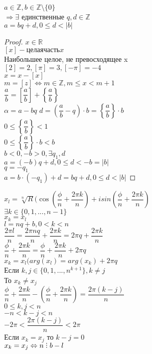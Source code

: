\begin{theorem}
	$ a \in \mathbb{Z}, b \in \mathbb{Z} \setminus \{0\} $ \\
	$ \Rightarrow \exists $ единственные $ q, d \in \mathbb{Z} $ \\
	$ a = bq + d, 0 \leq d < |b| $
	\begin{proof}
		$ x \in \mathbb{R} $\\
		$ [x] - целая часть x $ \\
		Наибольшее целое, не превосходящее x \\
		$ [2] = 2, [\pi] = 3, [-\pi] = -4 $ \\
		$ {x} = x - [x] $ \\
		$ m = [z] \Leftrightarrow m \in \mathbb{Z}, m \leq x < m+1 $ \\
		$ \dfrac{a}{b} = \left[ \dfrac{a}{b} \right] + \left\{ \dfrac{a}{b} \right\} $ \\
		$ \alpha = a - bq $ 
		$ d = \left( \dfrac{a}{b} - q \right) \cdot b = \left\{ \dfrac{a}{b} \right\} \cdot b $\\
		$ 0 \leq \left\{ \dfrac{a}{b} \right\} < 1 $ \\
		$ 0 \leq \left\{ \dfrac{a}{b} \right\} \cdot b < b $ \\
		$ b < 0, -b > 0,  \exists q_1, d $ \\
		$ a = (-b)q + d, 0 \leq d < -b = |b| $ \\
		$ q = -q_1 $ \\
		$ a = b \cdot (-q_1) + d = bq+d, 0 \leq d < |b| $ 
	\end{proof}
\end{theorem}

$ x_l = \sqrt[n]{R} (\cos( \dfrac{\phi}{n} + \dfrac{2 \pi k}{n}) + i sin( \dfrac{\phi}{n} + \dfrac{2 \pi k}{n} ) $ \\
$ \exists k \in \{0, 1, ..., n-1\} $ \\
$ x_k = x_l $ \\
$ l = nq+b, 0 < k < n $ \\
$ \dfrac{2 \pi l}{n} = \dfrac{2 \pi nq}{n} + \dfrac{2 \pi k}{n} = 2\pi q + \dfrac{2 \pi k}{n}  $\\
$ \dfrac{\phi}{n} + \dfrac{2 \pi k}{n} = \dfrac{ \phi }{n } + \dfrac{2 \pi k}{n} + 2 \pi q $ \\
$ x_k = x_l  (arg(x_l) = arg(x_k) + 2 \pi q$ \\
Если $ k, j \in  \{0,1,..., n^{k+1}\}, k \neq j $ \\
То $ x_k \neq x_j $ \\
$ \dfrac{\phi}{n} + \dfrac{2 \pi k}{n} - ( \dfrac{\phi}{n} + \dfrac{2 \pi k}{n}) = \dfrac{2 \pi (k - j)}{n} $ \\
$ 0 \leq k, j < n $\\
$ -n < k - j < n $ \\
$ -2 \pi < \dfrac{2 \pi (k - j)}{n}  <  2 \pi $ \\
Если $ x_k = x_j $ то $ k- j = 0 $ \\
$ x_k = x_j \Leftrightarrow n \divby b - l $ \\

